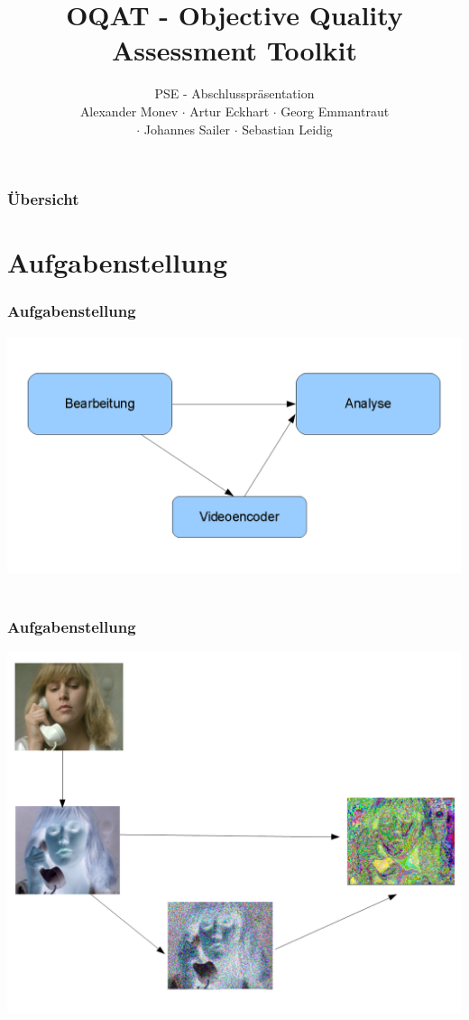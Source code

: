 \documentclass[t]{beamer}
\title{OQAT - Objective Quality Assessment Toolkit}
\subtitle{PSE - Abschlusspräsentation \\[0.3cm]
Alexander Monev $\cdot$ Artur Eckhart $\cdot$ Georg Emmantraut\\ $\cdot$ Johannes Sailer  $\cdot$ Sebastian
Leidig}
\institute[ITEC]{Institut für Technische Informatik}
\begin{document}
\begin{frame}
	\maketitle
\end{frame}

\begin{frame}
	\frametitle{Übersicht}
	\tableofcontents
\end{frame}

\section{Aufgabenstellung}
\begin{frame}
	\frametitle{Aufgabenstellung}
	\begin{center}
		\vspace*{\fill}
		\includegraphics[scale=.35]{img/aufgabe.png}
		\vspace*{\fill} ~\\
	\end{center}
\end{frame}
\begin{frame}
	\frametitle{Aufgabenstellung}
	\begin{center}
		\vspace*{\fill}
		\includegraphics[scale=.25]{img/aufgabe2.png}
		\vspace*{\fill} ~\\
	\end{center}
\end{frame}
\end{document}
